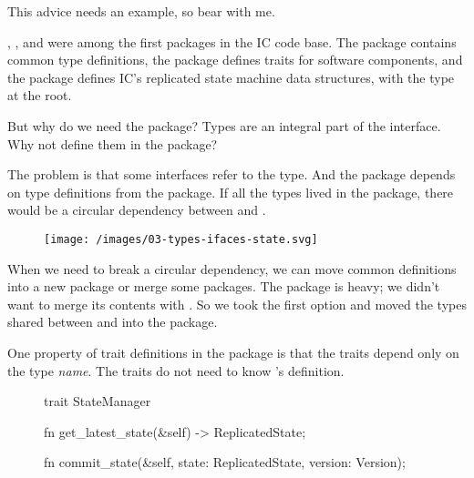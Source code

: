 \documentclass{article}
\begin{document}

This advice needs an example, so bear with me.

, , and  were among the first packages in the IC code base.
The  package contains common type definitions,
the  package defines traits for software components,
and the  package defines IC's replicated state machine data structures,
with the  type at the root.

But why do we need the  package?
Types are an integral part of the interface.
Why not define them in the  package?

The problem is that some interfaces refer to the  type.
And the  package depends on type definitions from the  package.
If all the types lived in the  package, there would be a circular dependency between  and .

\begin{figure}[grayscale-diagram]
  \texttt{[image: /images/03-types-ifaces-state.svg]}
\end{figure}

When we need to break a circular dependency, we can move common definitions into a new package or merge some packages.
The  package is heavy; we didn't want to merge its contents with .
So we took the first option and moved the types shared between  and  into the  package.

One property of trait definitions in the  package is that the traits depend only on the  type \emph{name}.
The traits do not need to know 's definition.

\begin{figure}
\begin{code}[good]
trait StateManager {
  fn get_latest_state(&self) -> ReplicatedState;

  fn commit_state(&self, state: ReplicatedState, version: Version);
}
\end{code}
\end{figure}
\end{document}
